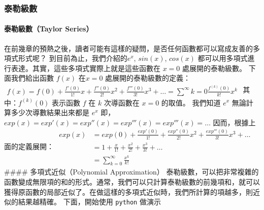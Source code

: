 \documentclass[11pt]{article}
\begin{document}
    \hypertarget{ux6cf0ux52d2ux7d1aux6578}{%
\subsubsection{泰勒級數}\label{ux6cf0ux52d2ux7d1aux6578}}

\hypertarget{ux6cf0ux52d2ux7d1aux6578taylor-series}{%
\paragraph{泰勒級數（Taylor
Series）}\label{ux6cf0ux52d2ux7d1aux6578taylor-series}}

在前幾章的預熱之後，讀者可能有這樣的疑問，是否任何函數都可以寫成友善的多項式形式呢？
到目前為止，我們介紹的\(e^x\), \(sin(x)\), \(cos(x)\)
都可以用多項式進行表達。其實，這些多項式實際上就是這些函數在 \(x=0\)
處展開的泰勒級數。 下面我們給出函數 \(f(x)\) 在\(x=0\)
處展開的泰勒級數的定義：
\(\begin{align*}f(x) = f(0) + \frac{f'(0)}{1!}x + \frac{f''(0)}{2!}x^2 + \frac{f'''(0)}{3!}x^3 + \dots = \sum^{\infty}{k = 0} \frac{f^{(k)}(0)}{k!}x^k \end{align*}\)
其中：\(f^{(k)}(0)\) 表示函數 \(f\) 在 \(k\) 次導函數在 \(x=0\) 的取值。
我們知道 \(e^x\) 無論計算多少次導數結果出來都是 \(e^x\)
即，\(exp(x) = exp'(x)=exp''(x)=exp'''(x)=exp'''(x) = \dots\)
因而，根據上面的定義展開：
\(\begin{align*}exp(x) &= exp(0) + \frac{exp'(0)}{1!}+\frac{exp''(0)}{2!}x^2 +\frac{exp'''(0)}{3!}x^3 + \dots \\ &=1 + \frac{x}{1!} + \frac{x^2}{2!} + \frac{x^3}{3!} + \dots \\&=\sum_{k=0}^{\infty}\frac{x^k}{k!}\end{align*}\)
\#\#\#\# 多項式近似（Polynomial Approximation）
泰勒級數，可以把非常複雜的函數變成無限項的和的形式。通常，我們可以只計算泰勒級數的前幾項和，就可以獲得原函數的局部近似了。在做這樣的多項式近似時，我們所計算的項越多，則近似的結果越精確。
下面，開始使用 \texttt{python} 做演示
\end{document}
